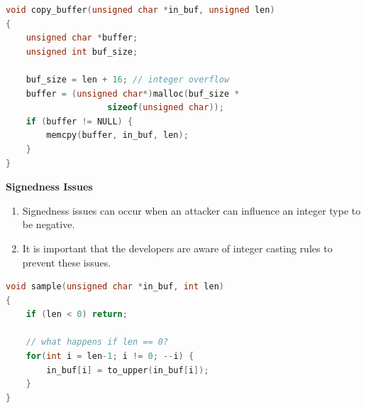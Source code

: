 \documentclass[12pt]{Training}
\begin{document}
\begin{sectionbox}
\begin{lstlisting}[language=C, caption={Integer Overflow Code}]
void copy_buffer(unsigned char *in_buf, unsigned len)
{
	unsigned char *buffer;
	unsigned int buf_size;

	buf_size = len + 16; // integer overflow
	buffer = (unsigned char*)malloc(buf_size *
					sizeof(unsigned char));
	if (buffer != NULL) {
		memcpy(buffer, in_buf, len);
	}
}
\end{lstlisting}
\end{sectionbox}

\textbf{Signedness Issues}
\begin{enumerate}
    \item Signedness issues can occur when an attacker can influence an integer type to be negative.
    \item It is important that the developers are aware of integer casting rules to prevent these issues.
\end{enumerate}

\begin{sectionbox}
\begin{lstlisting}[language=C, caption={Signedness Issues}]
void sample(unsigned char *in_buf, int len)
{
    if (len < 0) return;

    // what happens if len == 0?
    for(int i = len-1; i != 0; --i) {
        in_buf[i] = to_upper(in_buf[i]);
    }
}
\end{lstlisting}
\end{sectionbox}
\end{document}
